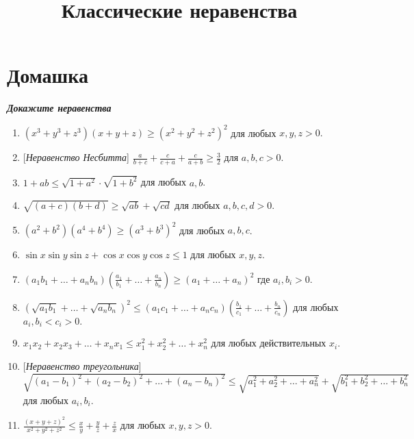 \documentclass[a4paper,12pt,leqno]{article}
\title{\textbf{Классические неравенства}}
\date{}
\theoremstyle{plain} %
\theoremstyle{definition} %
\theoremstyle{remark} %
\begin{document}
	\fontsize{14}{16pt}\selectfont
	\parskip=0mm
	\linespread{1}
	\maketitle
	
	
	\newcommand{\z}{\addtocounter{zadacha}{1}%
		\boxed{\arabic{zadacha}} }
	\section*{Домашка}
	\textbf{\textit{Докажите неравенства}}
	
	\newcommand{\ner}[1]{\item[\z] #1}
	
	\begin{enumerate}
		\ner{$(x^3+y^3+z^3)(x+y+z) \geqslant (x^2+y^2+z^2)^2$ для любых $x, y, z > 0.$}
		
		\ner{[\textit{Неравенство Несбитта}] $\displaystyle\frac{a}{b+c} + \frac{c}{c+a} + \frac{c}{a+b} \geqslant \frac{3}{2}$ для $a, b, c > 0.$}
		
		\ner{$1+ab \leqslant \sqrt{1+a^2} \cdot \sqrt{1+b^2}$ для любых $a, b$.}
		
		\ner{$\sqrt{(a+c)(b+d)} \geqslant \sqrt{ab} + \sqrt{cd}$ для любых $a, b, c, d > 0$.}
		
		\ner{$(a^2+b^2)(a^4+b^4) \geqslant (a^3+b^3)^2$ для любых $a, b, c$.}
		
		\ner{$\sin x \sin y \sin z + \cos x \cos y \cos z \leqslant 1$ для любых $x, y, z$.}
		
		\ner{$\displaystyle(a_1b_1 + \dots +a_nb_n) \left( \frac{a_1}{b_1} + \dots + \frac{a_n}{b_n} \right) \geqslant (a_1+\dots+a_n)^2 $ где $a_i, b_i > 0$.}
		
		\ner{$\displaystyle(\sqrt{a_1b_1} + \dots + \sqrt{a_nb_n})^2 \leqslant (a_1c_1 + \dots + a_nc_n)\left( \frac{b_1}{c_1} + \dots + \frac{b_n}{c_n}\right) $ для любых $a_i, b_i< c_i > 0.$}
		
		\ner{$x_1x_2 + x_2x_3 + \dots + x_nx_1 \leqslant x_1^2 + x_2^2 + \dots + x_n^2$ для любых действительных $x_i$.}
		
		\ner{[\textit{Неравенство треугольника}] $\sqrt{(a_1 - b_1)^2 + (a_2 - b_2)^2 + \dots + (a_n-b_n)^2} \leqslant \sqrt{a_1^2 + a_2^2 + \dots + a_n^2} + \sqrt{b_1^2 +b_2^2 + \dots + b_n^2}$ для любых $a_i, b_i$.}
		
		\ner{$\displaystyle\frac{(x+y+z)^2}{x^2+y^2+z^2} \leqslant \frac{x}{y} + \frac{y}{z} + \frac{z}{x}$ для любых $x, y, z > 0$.}
		

\end{enumerate}
\end{document}

